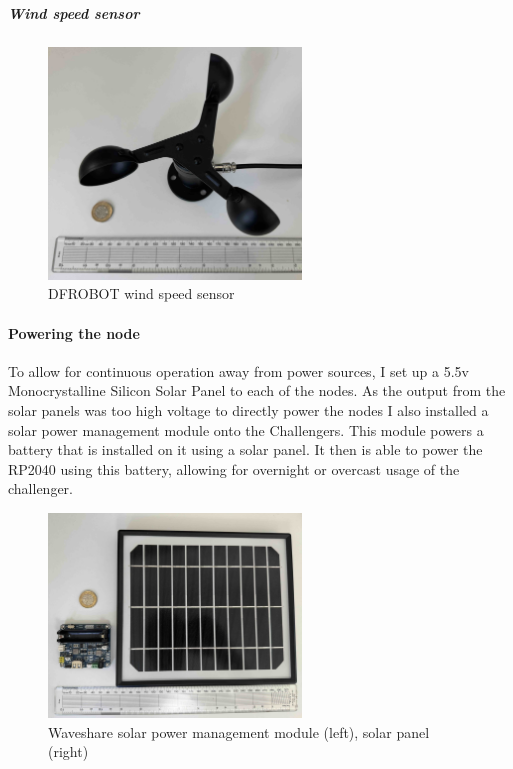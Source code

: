 \subparagraph{Wind speed sensor}

\begin{figure}[H]
    \centering
    \includegraphics[width=0.6\textwidth]{contents/22-hw-design/22-fig/wind-sensor.jpg}
    \caption{DFROBOT wind speed sensor}
    \label{fig:wind-sensor}
\end{figure}

\paragraph{Powering the node}

To allow for continuous operation away from power sources, I set up a 5.5v
Monocrystalline Silicon Solar Panel to each of the nodes. As the output from the
solar panels was too high voltage to directly power the nodes I also installed a
solar power management module onto the Challengers. This module powers a battery
that is installed on it using a solar panel. It then is able to power the RP2040
using this battery, allowing for overnight or overcast usage of the challenger.

\begin{figure}[H]
    \centering
    \includegraphics[width=0.6\textwidth]{contents/22-hw-design/22-fig/solar-panel-manager.jpg}
    \caption{Waveshare solar power management module (left), solar panel (right)}
    \label{fig:solar-module}
\end{figure}

